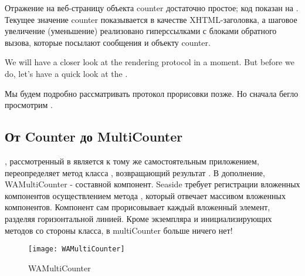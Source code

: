 \documentclass[a4paper,10pt,twoside]{book}
\begin{document}
Отражение на веб-страницу объекта counter достаточно простое; код показан на .
Текущее значение counter показывается в качестве XHTML-заголовка,
а шаговое увеличение (уменьшение) реализовано гиперссылками с
блоками обратного вызова,
которые посылают сообщения  и  объекту counter.

We will have a closer look at the rendering protocol in a moment.
But before we do, let's have a quick look at the .

Мы будем подробно рассматривать протокол прорисовки позже.
Но сначала бегло просмотрим .


\subsection{От Counter до MultiCounter}


, рассмотренный в  является к тому же
самостоятельным приложением,
переопределяет метод класса ,
возвращающий результат .
В дополнение, WAMultiCounter - составной компонент.
Seaside требует регистрации вложенных компонентов осуществлением метода ,
который отвечает массивом вложенных компонентов.
Компонент сам прорисовывает каждый вложенный элемент, разделяя горизонтальной линией.
Кроме экземпляра и инициализирующих методов со стороны класса,
в multiCounter больше ничего нет!

\begin{figure}[bht]
\begin{center}
\texttt{[image: WAMultiCounter]}
\caption{WAMultiCounter}
\end{center}
\end{figure}
\end{document}
